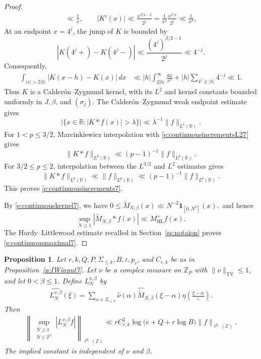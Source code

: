 \documentclass[12pt,reqno]{amsart}
\numberwithin{equation}{section}
\newtheorem{proposition}[equation]{Proposition}
\theoremstyle{definition}
\theoremstyle{remark}
\begin{document}
\begin{proof}
\begin{align*}
 \ll \frac1x, \qquad 
 |K'(x)|
 \ll
 \frac{x^{\beta/2-2}}{2^j}
 =
 \frac1{x^2}\frac{x^{\beta/2}}{2^j}
 \ll \frac1{x^2},
\end{align*}
At an endpoint \(x=4^j\), the jump of \(K\) is bounded by
\[
 \left|K(4^j+)-K(4^j-)\right|
 \ll
 \frac{(4^j)^{\beta/2-1}}{2^j}
 \ll 4^{-j}.
\]
Consequently,
\begin{align}\label{e:Hormander7}
 \int_{|x|>2|h|}
 |K(x-h)-K(x)|\,dx
 &\ll
 |h|\int_{2|h|}^{\infty}\frac{dx}{x^2}
 +
 |h|\sum_{4^j\gtrsim|h|}4^{-j}
 \ll1.
\end{align}
Thus \(K\) is a Calderón--Zygmund kernel, with its \(L^2\) and kernel
constants bounded uniformly in \(J,\beta\), and \((\sigma_j)\).
The Calderón--Zygmund weak endpoint estimate gives
\[
 \bigl|\{x\in\mathbb R:|K*f(x)|>\lambda\}\bigr|
 \ll \lambda^{-1}\|f\|_{L^1(\mathbb R)}.
\]
For \(1<p\leq3/2\), Marcinkiewicz interpolation with
\eqref{e:continuousincrementsL27} gives
\[
 \|K*f\|_{L^p(\mathbb R)}
 \ll (p-1)^{-1}\|f\|_{L^p(\mathbb R)}.
\]
For \(3/2\leq p\leq2\), interpolation between the \(L^{3/2}\) and
\(L^2\) estimates gives
\[
 \|K*f\|_{L^p(\mathbb R)}
 \ll\|f\|_{L^p(\mathbb R)}
 \ll(p-1)^{-1}\|f\|_{L^p(\mathbb R)}.
\]
This proves \eqref{e:continuousincrements7}.


By \eqref{e:continuouskernel7}, we have $0\leq\widetilde M_{N,\beta}(x)
 \ll N^{-2}\mathbf1_{[0,N^2]}(x),$
and hence
\[
 \sup_{N\geq1}
 |\widetilde M_{N,\beta}*f(x)|
 \ll M_{\mathrm{HL}}^+f(x).
\]
The Hardy--Littlewood estimate recalled in Section~\ref{ss:notaion}
proves \eqref{e:continuousmaximal7}.
\end{proof}



\begin{proposition}
\label{p:orlicz-low}
Let \(r,k,Q,P,\Sigma_{\leq k},B,\varepsilon,p_r\), and
\(C_{r,k}\) be as in Proposition~\ref{p:IWinput7}.
Let \(\nu\) be a complex measure on \(\mathbb Z_P\) with
\(\|\nu\|_{\mathrm{TV}}\leq1\), and let \(0<\beta\leq1\).  Define
\(L_N^{\nu,\beta}\) by
\begin{align}\label{e:deforliczlow7}
 \widehat{L_N^{\nu,\beta}}(\xi)
 =
 \sum_{\alpha\in\Sigma_{\leq k}}
 \widehat\nu(\alpha)
 \widehat{\widetilde M}_{N,\beta}(\xi-\alpha)
 \eta\left(\frac{\xi-\alpha}{\varepsilon}\right).
\end{align}
Then
\begin{align}\label{e:orlicz-low}
 \left\|
 \sup_{\substack{N\geq1\\N\in2^{\mathbb N}}}
 |L_N^{\nu,\beta}f|
 \right\|_{\ell^{p_r}(\mathbb Z)}
 \ll
 rC_{r,k}^2
 \log\bigl(e+Q+r\log B\bigr)
 \|f\|_{\ell^{p_r}(\mathbb Z)}.
\end{align}
The implied constant is independent of \(\nu\) and \(\beta\).
\end{proposition}
\end{document}
